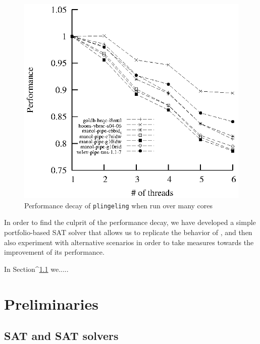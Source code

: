 \documentclass{llncs}
\begin{document}
\begin{figure}[tp]
  \centering
  \includegraphics[scale=1]{plingeling_6cores_speedup}
  \caption{Performance decay of {\tt plingeling} when run over many cores}
  \label{fig:decay}
\end{figure}

In order to find the culprit of the performance decay, we have
developed a simple portfolio-based SAT solver that allows us to
replicate the behavior of \pling, and then also experiment with
alternative scenarios in order to take measures towards the
improvement of its performance.

In Section^\ref{} we.....

\section{Preliminaries}
\label{sec:preliminaries}
\subsection{SAT and SAT solvers}
\end{document}
